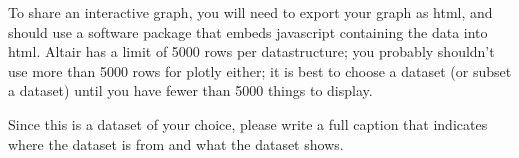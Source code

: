 \documentclass[]{book}
\theoremstyle{definition}
\newtheorem*{soln}{Solution}
\begin{document}
\begin{enumerate}
To share an interactive graph, you will need to export your graph as html, and should use a software package that embeds javascript containing the data into html.   Altair has a limit of 5000 rows per datastructure; you probably shouldn't use more than 5000 rows for plotly either; it is best to choose a dataset (or subset a dataset) until you have fewer than 5000 things to display.  

Since this is a dataset of your choice, please write a full caption that indicates where the dataset is from and what the dataset shows.


\end{enumerate}
\end{document}
